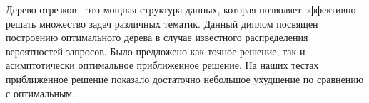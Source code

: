 Дерево отрезков - это мощная структура данных, которая позволяет эффективно решать множество задач различных тематик. Данный диплом посвящен построению оптимального дерева в случае известного распределения вероятностей запросов. Было предложено как точное решение, так и асимптотически оптимальное приближенное решение. На наших тестах приближенное решение показало достаточно небольшое ухудшение по сравнению с оптимальным.